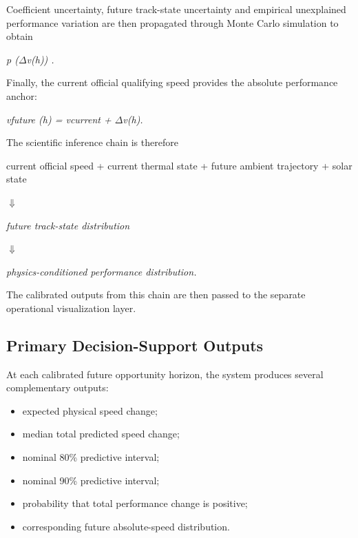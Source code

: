 Coefficient uncertainty, future track-state uncertainty and empirical unexplained performance variation are then propagated through Monte Carlo simulation to obtain

\begin{center}\textit{p (\ensuremath{\Delta}v(h)) .}\end{center}

Finally, the current official qualifying speed provides the absolute performance anchor:

\begin{center}\textit{vfuture (h) = vcurrent + \ensuremath{\Delta}v(h).}\end{center}

The scientific inference chain is therefore

current official speed + current thermal state + future ambient trajectory + solar state

\begin{center}\textit{\ensuremath{\Downarrow}}\end{center}

\begin{center}\textit{future track-state distribution}\end{center}

\begin{center}\textit{\ensuremath{\Downarrow}}\end{center}

\begin{center}\textit{physics-conditioned performance distribution.}\end{center}

The calibrated outputs from this chain are then passed to the separate operational visualization layer.

\subsection{Primary Decision-Support Outputs}
At each calibrated future opportunity horizon, the system produces several complementary outputs:

\begin{itemize}
\item expected physical speed change;
\item median total predicted speed change;
\item nominal 80\% predictive interval;
\item nominal 90\% predictive interval;
\item probability that total performance change is positive;
\item corresponding future absolute-speed distribution.
\end{itemize}

